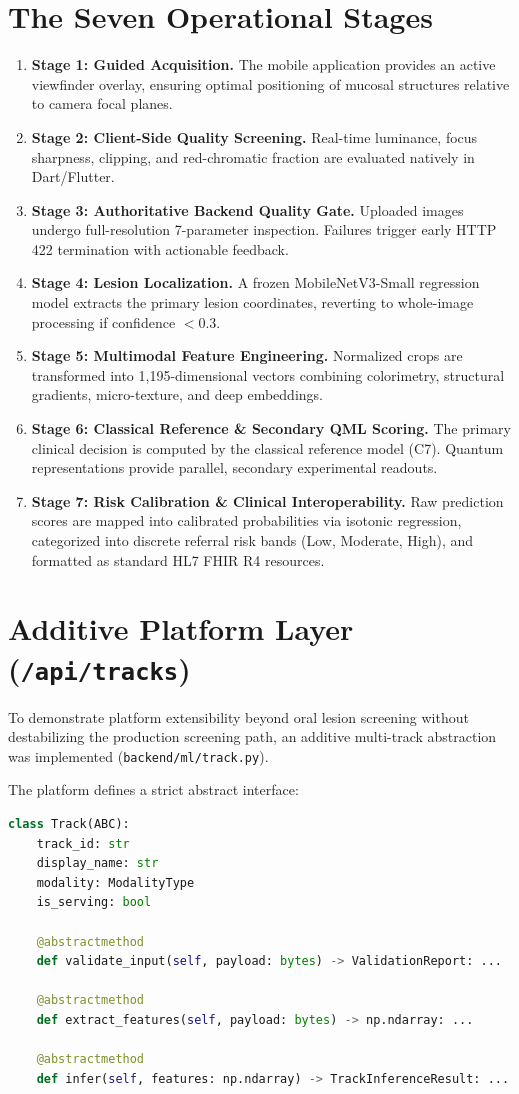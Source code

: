 \documentclass[11pt,a4paper]{report}
\begin{document}
\section{The Seven Operational Stages}
\begin{enumerate}
  \item \textbf{Stage 1: Guided Acquisition.} The mobile application provides an active viewfinder overlay, ensuring optimal positioning of mucosal structures relative to camera focal planes.
  \item \textbf{Stage 2: Client-Side Quality Screening.} Real-time luminance, focus sharpness, clipping, and red-chromatic fraction are evaluated natively in Dart/Flutter.
  \item \textbf{Stage 3: Authoritative Backend Quality Gate.} Uploaded images undergo full-resolution 7-parameter inspection. Failures trigger early HTTP 422 termination with actionable feedback.
  \item \textbf{Stage 4: Lesion Localization.} A frozen MobileNetV3-Small regression model extracts the primary lesion coordinates, reverting to whole-image processing if confidence $< 0.3$.
  \item \textbf{Stage 5: Multimodal Feature Engineering.} Normalized crops are transformed into 1,195-dimensional vectors combining colorimetry, structural gradients, micro-texture, and deep embeddings.
  \item \textbf{Stage 6: Classical Reference \& Secondary QML Scoring.} The primary clinical decision is computed by the classical reference model (C7). Quantum representations provide parallel, secondary experimental readouts.
  \item \textbf{Stage 7: Risk Calibration \& Clinical Interoperability.} Raw prediction scores are mapped into calibrated probabilities via isotonic regression, categorized into discrete referral risk bands (Low, Moderate, High), and formatted as standard HL7 FHIR R4 resources.
\end{enumerate}

\section{Additive Platform Layer (\texttt{/api/tracks})}
To demonstrate platform extensibility beyond oral lesion screening without destabilizing the production screening path, an additive multi-track abstraction was implemented (\texttt{backend/ml/track.py}). 

The platform defines a strict abstract interface:
\begin{lstlisting}[language=Python]
class Track(ABC):
    track_id: str
    display_name: str
    modality: ModalityType
    is_serving: bool
    
    @abstractmethod
    def validate_input(self, payload: bytes) -> ValidationReport: ...
    
    @abstractmethod
    def extract_features(self, payload: bytes) -> np.ndarray: ...
    
    @abstractmethod
    def infer(self, features: np.ndarray) -> TrackInferenceResult: ...
\end{lstlisting}
\end{document}
